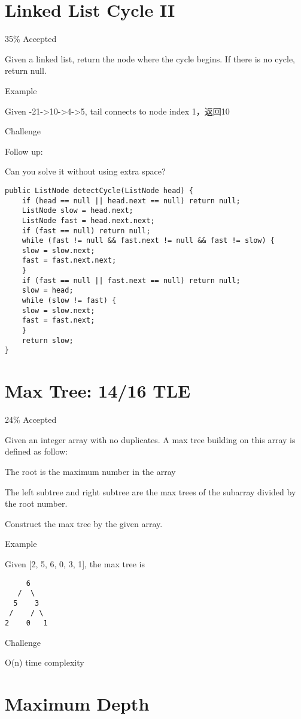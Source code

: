 \documentclass[12pt]{book}
\begin{document}
\chapter{Linked List Cycle II}
\label{sec-34}

35\% Accepted

Given a linked list, return the node where the cycle begins. If there is no cycle, return null.

Example

Given -21->10->4->5, tail connects to node index 1，返回10

Challenge

Follow up:

Can you solve it without using extra space? 
\lstset{language=java,label= ,caption= ,numbers=none}
\begin{lstlisting}
public ListNode detectCycle(ListNode head) {  
    if (head == null || head.next == null) return null;
    ListNode slow = head.next;
    ListNode fast = head.next.next;
    if (fast == null) return null;
    while (fast != null && fast.next != null && fast != slow) {
	slow = slow.next;
	fast = fast.next.next;
    }
    if (fast == null || fast.next == null) return null;
    slow = head;
    while (slow != fast) {
	slow = slow.next;
	fast = fast.next;
    }
    return slow;
}
\end{lstlisting}
\chapter{Max Tree: 14/16 TLE}
\label{sec-35}

24\% Accepted

Given an integer array with no duplicates. A max tree building on this array is defined as follow:

The root is the maximum number in the array

The left subtree and right subtree are the max trees of the subarray divided by the root number.

Construct the max tree by the given array.

Example

Given [2, 5, 6, 0, 3, 1], the max tree is
\lstset{language=java,label= ,caption= ,numbers=none}
\begin{lstlisting}
     6
   /  \
  5    3
 /    / \
2    0   1
\end{lstlisting}
Challenge

O(n) time complexity
\chapter{Maximum Depth}
\label{sec-36}
\end{document}
